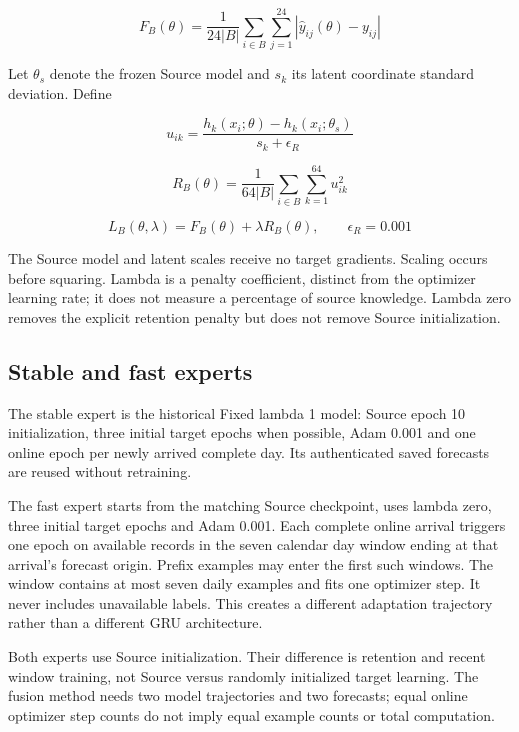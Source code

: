 \documentclass[pdflatex,iicol,sn-mathphys-num]{sn-jnl}
\begin{document}
\begin{equation}
F_B(\theta)=\frac{1}{24|B|}\sum_{i\in B}\sum_{j=1}^{24}|\hat y_{ij}(\theta)-y_{ij}|
\end{equation}

Let $\theta_s$ denote the frozen Source model and $s_k$ its latent coordinate standard deviation. Define

\begin{equation}
u_{ik}=\frac{h_k(x_i;\theta)-h_k(x_i;\theta_s)}{s_k+\epsilon_R}
\end{equation}

\begin{equation}
R_B(\theta)=\frac{1}{64|B|}\sum_{i\in B}\sum_{k=1}^{64}u_{ik}^{2}
\end{equation}

\begin{equation}
L_B(\theta,\lambda)=F_B(\theta)+\lambda R_B(\theta),\qquad\epsilon_R=0.001
\end{equation}

The Source model and latent scales receive no target gradients. Scaling occurs before squaring. Lambda is a penalty coefficient, distinct from the optimizer learning rate; it does not measure a percentage of source knowledge. Lambda zero removes the explicit retention penalty but does not remove Source initialization.

\subsection{Stable and fast experts}

The stable expert is the historical Fixed lambda 1 model: Source epoch 10 initialization, three initial target epochs when possible, Adam 0.001 and one online epoch per newly arrived complete day. Its authenticated saved forecasts are reused without retraining.

The fast expert starts from the matching Source checkpoint, uses lambda zero, three initial target epochs and Adam 0.001. Each complete online arrival triggers one epoch on available records in the seven calendar day window ending at that arrival's forecast origin. Prefix examples may enter the first such windows. The window contains at most seven daily examples and fits one optimizer step. It never includes unavailable labels. This creates a different adaptation trajectory rather than a different GRU architecture.

Both experts use Source initialization. Their difference is retention and recent window training, not Source versus randomly initialized target learning. The fusion method needs two model trajectories and two forecasts; equal online optimizer step counts do not imply equal example counts or total computation.
\end{document}

